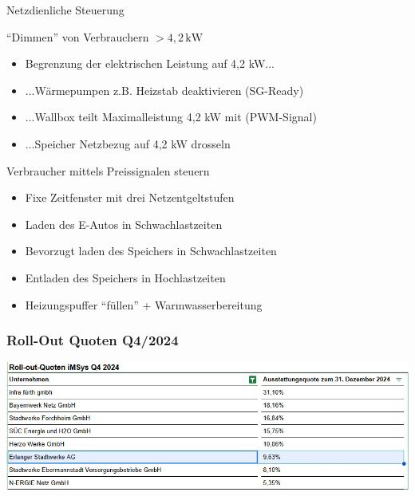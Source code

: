 \begin{frame}{Netzdienliche Steuerung}
   \begin{block}{\enquote{Dimmen} von Verbrauchern $>4,2\,\text{kW}$}
      \begin{itemize}         
         \item Begrenzung der elektrischen Leistung auf 4,2 kW...
         \item ...Wärmepumpen z.B. Heizstab deaktivieren (SG-Ready)
         \item ...Wallbox teilt Maximalleistung 4,2 kW mit (PWM-Signal)
         \item ...Speicher Netzbezug auf 4,2 kW drosseln
      \end{itemize}
   \end{block}
   \begin{block}{Verbraucher mittels Preissignalen steuern}
      \begin{itemize}
         \item Fixe Zeitfenster mit drei Netzentgeltstufen
         \item Laden des E-Autos in Schwachlastzeiten
         \item Bevorzugt laden des Speichers in Schwachlastzeiten
         \item Entladen des Speichers in Hochlastzeiten
         \item Heizungspuffer \enquote{füllen} + Warmwasserbereitung
      \end{itemize}
   \end{block}
   \vspace{0.3cm}
\end{frame}

\begin{frame}
   \frametitle{Roll-Out Quoten Q4/2024}
   \centering
   \includegraphics[width=0.95\paperwidth]{images/Roll-Out-Quoten.jpg}
\end{frame}
